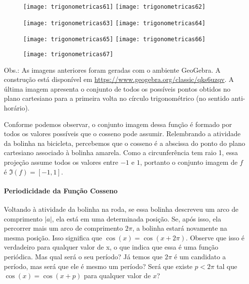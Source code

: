 \begin{figure}[H]
\centering

\texttt{[image: trigonometricas61]}
\texttt{[image: trigonometricas62]}

\texttt{[image: trigonometricas63]}
\texttt{[image: trigonometricas64]}

\texttt{[image: trigonometricas65]}
\texttt{[image: trigonometricas66]}

\end{figure}

\begin{figure}[H]
\centering

\texttt{[image: trigonometricas67]}
\end{figure}

Obs.: As imagens anteriores foram geradas com o ambiente GeoGebra. A construção está disponível em \url{https://www.geogebra.org/classic/qks6uzqv}. A última imagem apresenta o conjunto de todos os possíveis pontos obtidos no plano cartesiano para a primeira volta no círculo trigonométrico (no sentido anti-horário).

Conforme podemos observar, o conjunto imagem dessa função é formado por todos os valores possíveis que o cosseno pode assumir. Relembrando a atividade da bolinha na bicicleta, percebemos que o cosseno é a abscissa do ponto do plano cartesiano associado à bolinha amarela. Como a circunferência tem raio 1, essa projeção assume todos os valores entre $-1$ e $1$, portanto o conjunto imagem de $f$ é $\Im(f)=[-1,1]$.

\paragraph{Periodicidade da Função Cosseno}

Voltando à atividade da bolinha na roda, se essa bolinha descreveu um arco de comprimento $|a|$, ela está em uma determinada posição. Se, após isso, ela percorrer mais um arco de comprimento $2\pi$, a bolinha estará novamente na mesma posição. Isso significa que $\cos(x)=\cos(x+2\pi)$. Observe que isso é verdadeiro para qualquer valor de x, o que indica que essa é uma função periódica. Mas qual será o seu período? Já temos que $2\pi$ é um candidato a período, mas será que ele é mesmo um período? Será que existe $p<2\pi$ tal que $\cos(x)=\cos(x+p)$ para qualquer valor de $x$?

